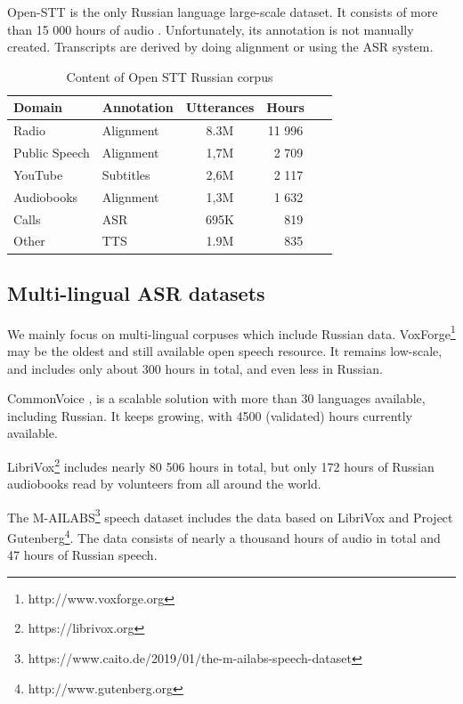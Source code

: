 \documentclass[a4paper]{article}
\begin{document}
Open-STT is the only Russian language large-scale dataset. It consists of more than 15 000 hours of audio \cite{veysov2020towardimagenetstt}. Unfortunately, its annotation is not manually created. Transcripts are derived by doing alignment or using the ASR system. 

\begin{table}[th]
  \caption{Content of Open STT Russian corpus}
  \label{tab:openstt}
  \centering
  \begin{tabular}{ llcr }
    \toprule
    Domain & Annotation & Utterances & Hours~~~  \\
    \midrule
    Radio &     Alignment & 8.3M & 11 996 ~~~  \\
    Public Speech & Alignment  & 1,7M & 2 709 ~~~ \\
    YouTube & Subtitles  & 2,6M & 2 117 ~~~ \\
    Audiobooks & Alignment  & 1,3M & 1 632 ~~~ \\
    Calls & ASR  & 695K & 819 ~~~ \\
    Other & TTS  & 1.9M & 835 ~~~ \\
    \bottomrule
  \end{tabular}
\end{table}

\subsection{Multi-lingual ASR datasets}

We mainly focus on multi-lingual corpuses which include Russian data. VoxForge\footnote{http://www.voxforge.org} may be the oldest and still available open speech resource. It remains low-scale, and includes only about 300 hours in total, and even less in Russian.

CommonVoice \cite{ardila2019common}, is a scalable solution with more than 30 languages available, including Russian. It keeps growing, with 4500 (validated) hours currently available.

LibriVox\footnote{https://librivox.org} includes nearly 80 506 hours in total, but only 172 hours of Russian audiobooks read by volunteers from all around the world.

The M-AILABS\footnote{https://www.caito.de/2019/01/the-m-ailabs-speech-dataset} speech dataset includes the data based on LibriVox and Project Gutenberg\footnote{http://www.gutenberg.org}. The data consists of nearly a thousand hours of audio in total and 47 hours of Russian speech.
\end{document}
